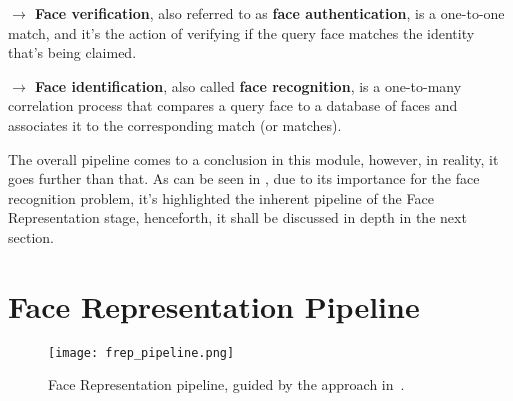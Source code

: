 \documentclass[class=report, crop=false, a4paper, 12pt]{standalone}
\begin{document}
\vspace{0.7\baselineskip}
\noindent\textbf{$\rightarrow$ Face verification}, also referred to as \textbf{face authentication}, is a one-to-one match, and it's the action of verifying if the query face matches the identity that's being claimed. ~\autocite{liHandbookFaceRecognition2011}

\vspace{0.7\baselineskip}
\noindent\textbf{$\rightarrow$ Face identification}, also called \textbf{face recognition}, is a one-to-many correlation process that compares a query face to a database of faces and associates it to the corresponding match (or matches). ~\autocite{liHandbookFaceRecognition2011}



\vspace{0.7\baselineskip}
\par The overall pipeline comes to a conclusion in this module, however, in reality, it goes further than that. As can be seen in , due to its importance for the face recognition problem, it's highlighted the inherent pipeline of the Face Representation stage, henceforth, it shall be discussed in depth in the next section.

\vspace{\baselineskip}

\newpage
\section{Face Representation Pipeline}
\begin{figure}[!h]
    \centering
    \texttt{[image: frep\_pipeline.png]}
    \caption[Pipeline]{Face Representation pipeline, guided by the approach in~\autocite{wangDeepFaceRecognition2021}.}
    \label{fig:frep pipeline}
\end{figure}
\end{document}
